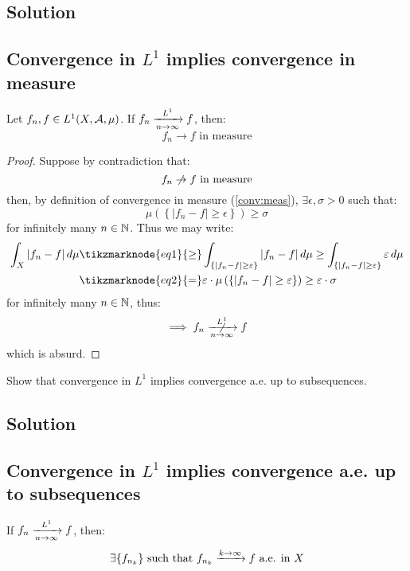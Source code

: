 \subsection*{Solution}

\subsection{Convergence in \texorpdfstring{$L^1$}{L1} implies convergence in measure} \label{L1->measure}
Let $f_n,f \in L^1(X,\mathcal{A},\mu)$. If $f_n \xrightarrow[n\to\infty]{L^1} f$, then:
\[
    f_n \to f \text{ in measure}    
\]

\begin{proof}
    Suppose by contradiction that:
    \[
        f_n \centernot \to f \text{ in measure}    
    \]
    then, by definition of convergence in measure (\ref{conv:meas}), $\exists \epsilon, \sigma > 0$ such that:
    \[
         \mu \left( \left\{ |f_n-f| \geq \epsilon \right\} \right) \geq \sigma
    \]
    for infinitely many $n\in\mathbb{N}$. Thus we may write:
    \begin{align*}
        \int_X |f_n-f| \, d\mu & \tikzmarknode{eq1}{\geq} \int_{ \{ |f_n-f| \geq \epsilon \} } |f_n-f| \, d\mu \geq \int_{ \{ |f_n-f| \geq \epsilon \} } \epsilon \, d\mu  \\
        & \tikzmarknode{eq2}{=} \epsilon \cdot \mu \left( \left\{ |f_n-f| \geq \epsilon \right\} \right) \geq \epsilon \cdot \sigma
    \end{align*} 
    for infinitely many $n\in\mathbb{N}$, thus:
    \[
        \implies f_n \centernot{\toin{L^1}} f    
    \]
    which is absurd.
\end{proof}


\question
Show that convergence in $L^1$ implies convergence a.e. up to subsequences.

\subsection*{Solution}

\subsection{Convergence in \texorpdfstring{$L^1$}{L1} implies convergence a.e. up to subsequences}
If $f_n \xrightarrow[n\to\infty]{L^1} f$, then:
\[
    \exists \{ f_{n_k} \} \text{ such that } f_{n_k} \xrightarrow{k\to\infty} f \text{ a.e. in } X
\]

